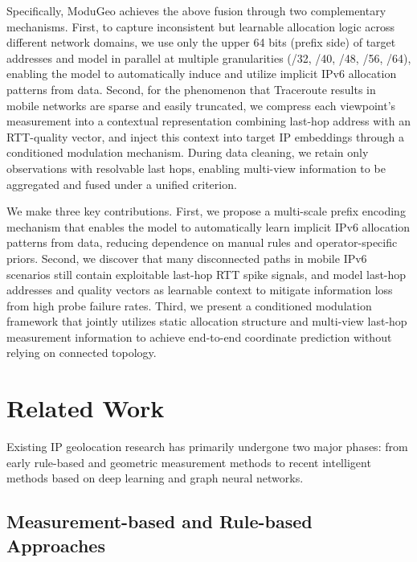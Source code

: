 \documentclass[runningheads]{llncs}
\begin{document}
Specifically, ModuGeo achieves the above fusion through two complementary mechanisms. First, to capture inconsistent but learnable allocation logic across different network domains, we use only the upper 64 bits (prefix side) of target addresses and model in parallel at multiple granularities (/32, /40, /48, /56, /64), enabling the model to automatically induce and utilize implicit IPv6 allocation patterns from data. Second, for the phenomenon that Traceroute results in mobile networks are sparse and easily truncated, we compress each viewpoint's measurement into a contextual representation combining last-hop address with an RTT-quality vector, and inject this context into target IP embeddings through a conditioned modulation mechanism. During data cleaning, we retain only observations with resolvable last hops, enabling multi-view information to be aggregated and fused under a unified criterion.

We make three key contributions. First, we propose a multi-scale prefix encoding mechanism that enables the model to automatically learn implicit IPv6 allocation patterns from data, reducing dependence on manual rules and operator-specific priors. Second, we discover that many disconnected paths in mobile IPv6 scenarios still contain exploitable last-hop RTT spike signals, and model last-hop addresses and quality vectors as learnable context to mitigate information loss from high probe failure rates. Third, we present a conditioned modulation framework that jointly utilizes static allocation structure and multi-view last-hop measurement information to achieve end-to-end coordinate prediction without relying on connected topology.

\section{Related Work}

Existing IP geolocation research has primarily undergone two major phases: from early rule-based and geometric measurement methods to recent intelligent methods based on deep learning and graph neural networks.

\subsection{Measurement-based and Rule-based Approaches}
\end{document}
